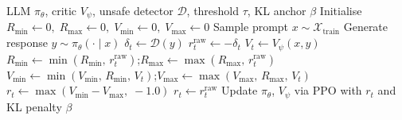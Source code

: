 \documentclass[a4paper,twoside,12pt]{report}
\newcommand{\vmin}{V_{\min}}
\newcommand{\vmax}{V_{\max}}
\newcommand{\rmin}{R_{\min}}
\newcommand{\rmax}{R_{\max}}
\begin{document}
\begin{algorithm}[H]
\caption{PPO + Minmax Penalty (LLM adaptation of ROSARL \citep{nanguetasse2026})}
\label{alg:minmax}
\begin{algorithmic}[1]
\Require LLM $\pi_\theta$, critic $V_\psi$, unsafe detector $\mathcal{D}$, threshold $\tau$, KL anchor $\beta$
\State Initialise $\rmin \leftarrow 0,\; \rmax \leftarrow 0,\; \vmin \leftarrow 0,\; \vmax \leftarrow 0$ 
  \State Sample prompt $x \sim \mathcal{X}_{\text{train}}$
  \State Generate response $y \sim \pi_\theta(\cdot \mid x)$
  \State $\delta_t \leftarrow \mathcal{D}(y)$ 
  \State $r^{\text{raw}}_t \leftarrow -\delta_t$ 
  \State $V_t \leftarrow V_\psi(x, y)$ 
  \State $\rmin \leftarrow \min(\rmin,\, r^{\text{raw}}_t)$;\quad $\rmax \leftarrow \max(\rmax,\, r^{\text{raw}}_t)$ 
  \State $\vmin \leftarrow \min(\vmin,\, \rmin,\, V_t)$;\quad $\vmax \leftarrow \max(\vmax,\, \rmax,\, V_t)$ 
   
    \State $r_t \leftarrow \max(\vmin - \vmax,\; -1.0)$ 
  \Else
    \State $r_t \leftarrow r^{\text{raw}}_t$ 
  \EndIf
  \State Update $\pi_\theta$, $V_\psi$ via PPO with $r_t$ and KL penalty $\beta$
\EndFor
\end{algorithmic}
\end{algorithm}
\end{document}
